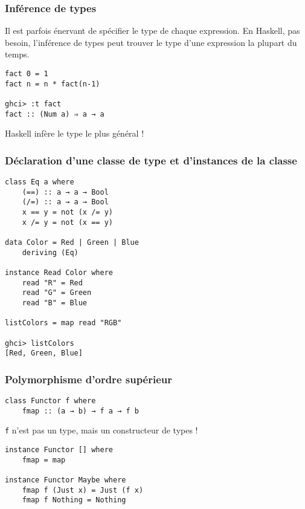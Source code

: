 \documentclass[10pt]{beamer}
\begin{document}
\begin{frame}[fragile]
\frametitle{Inférence de types}
Il est parfois énervant de spécifier le type de chaque expression. En Haskell,
pas besoin, l'inférence de types peut trouver le type d'une expression la
plupart du temps.

\begin{verbatim}
fact 0 = 1
fact n = n * fact(n-1)

ghci> :t fact
fact :: (Num a) ⇒ a → a
\end{verbatim}

Haskell infère le type le plus général !
\end{frame}



\begin{frame}[fragile]
\frametitle{Déclaration d'une classe de type et d'instances de la classe}
\begin{verbatim}
class Eq a where
    (==) :: a → a → Bool
    (/=) :: a → a → Bool
    x == y = not (x /= y)
    x /= y = not (x == y)

data Color = Red | Green | Blue
    deriving (Eq)

instance Read Color where
    read "R" = Red
    read "G" = Green
    read "B" = Blue

listColors = map read "RGB"

ghci> listColors
[Red, Green, Blue]
\end{verbatim}
\end{frame}



\begin{frame}[fragile]
\frametitle{Polymorphisme d'ordre supérieur}
\begin{verbatim}
class Functor f where
    fmap :: (a → b) → f a → f b
\end{verbatim}

\verb|f| n'est pas un type, mais un constructeur de types !

\begin{verbatim}
instance Functor [] where
    fmap = map

instance Functor Maybe where
    fmap f (Just x) = Just (f x)
    fmap f Nothing = Nothing
\end{verbatim}
\end{frame}
\end{document}
